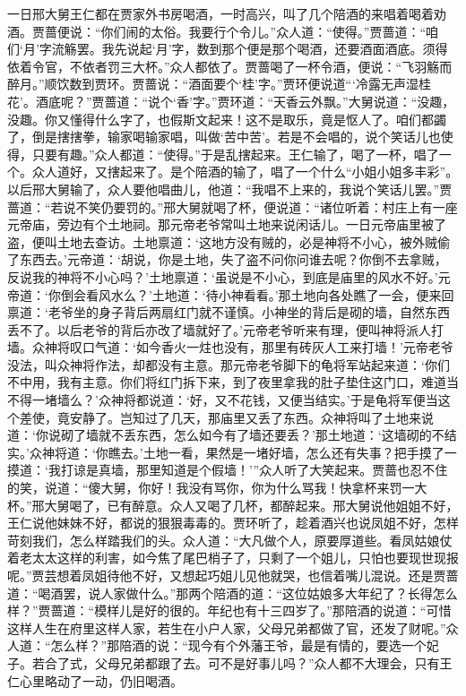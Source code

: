 \begin{parag}
    一日邢大舅王仁都在贾家外书房喝酒，一时高兴，叫了几个陪酒的来唱着喝着劝酒。贾蔷便说：“你们闹的太俗。我要行个令儿。”众人道：“使得。”贾蔷道：“咱们‘月’字流觞罢。我先说起‘月’字，数到那个便是那个喝酒，还要酒面酒底。须得依着令官，不依者罚三大杯。”众人都依了。贾蔷喝了一杯令酒，便说：“飞羽觞而醉月。”顺饮数到贾环。贾蔷说：“酒面要个‘桂’字。”贾环便说道“‘冷露无声湿桂花’。酒底呢？”贾蔷道：“说个‘香’字。”贾环道：“天香云外飘。”大舅说道：“没趣，没趣。你又懂得什么字了，也假斯文起来！这不是取乐，竟是怄人了。咱们都蠲了，倒是搳搳拳，输家喝输家唱，叫做‘苦中苦’。若是不会唱的，说个笑话儿也使得，只要有趣。”众人都道：“使得。”于是乱搳起来。王仁输了，喝了一杯，唱了一个。众人道好，又搳起来了。是个陪酒的输了，唱了一个什么“小姐小姐多丰彩”。以后邢大舅输了，众人要他唱曲儿，他道：“我唱不上来的，我说个笑话儿罢。”贾蔷道：“若说不笑仍要罚的。”邢大舅就喝了杯，便说道：“诸位听着：村庄上有一座元帝庙，旁边有个土地祠。那元帝老爷常叫土地来说闲话儿。一日元帝庙里被了盗，便叫土地去查访。土地禀道：‘这地方没有贼的，必是神将不小心，被外贼偷了东西去。’元帝道：‘胡说，你是土地，失了盗不问你问谁去呢？你倒不去拿贼，反说我的神将不小心吗？’土地禀道：‘虽说是不小心，到底是庙里的风水不好。’元帝道：‘你倒会看风水么？’土地道：‘待小神看看。’那土地向各处瞧了一会，便来回禀道：‘老爷坐的身子背后两扇红门就不谨慎。小神坐的背后是砌的墙，自然东西丢不了。以后老爷的背后亦改了墙就好了。’元帝老爷听来有理，便叫神将派人打墙。众神将叹口气道：‘如今香火一炷也没有，那里有砖灰人工来打墙！’元帝老爷没法，叫众神将作法，却都没有主意。那元帝老爷脚下的龟将军站起来道：‘你们不中用，我有主意。你们将红门拆下来，到了夜里拿我的肚子垫住这门口，难道当不得一堵墙么？’众神将都说道：‘好，又不花钱，又便当结实。’于是龟将军便当这个差使，竟安静了。岂知过了几天，那庙里又丢了东西。众神将叫了土地来说道：‘你说砌了墙就不丢东西，怎么如今有了墙还要丢？’那土地道：‘这墙砌的不结实。’众神将道：‘你瞧去。’土地一看，果然是一堵好墙，怎么还有失事？把手摸了一摸道：‘我打谅是真墙，那里知道是个假墙！’”众人听了大笑起来。贾蔷也忍不住的笑，说道：“傻大舅，你好！我没有骂你，你为什么骂我！快拿杯来罚一大杯。”邢大舅喝了，已有醉意。众人又喝了几杯，都醉起来。邢大舅说他姐姐不好，王仁说他妹妹不好，都说的狠狠毒毒的。贾环听了，趁着酒兴也说凤姐不好，怎样苛刻我们，怎么样踏我们的头。众人道：“大凡做个人，原要厚道些。看凤姑娘仗着老太太这样的利害，如今焦了尾巴梢子了，只剩了一个姐儿，只怕也要现世现报呢。”贾芸想着凤姐待他不好，又想起巧姐儿见他就哭，也信着嘴儿混说。还是贾蔷道：“喝酒罢，说人家做什么。”那两个陪酒的道：“这位姑娘多大年纪了？长得怎么样？”贾蔷道：“模样儿是好的很的。年纪也有十三四岁了。”那陪酒的说道：“可惜这样人生在府里这样人家，若生在小户人家，父母兄弟都做了官，还发了财呢。”众人道：“怎么样？”那陪酒的说：“现今有个外藩王爷，最是有情的，要选一个妃子。若合了式，父母兄弟都跟了去。可不是好事儿吗？”众人都不大理会，只有王仁心里略动了一动，仍旧喝酒。
\end{parag}


